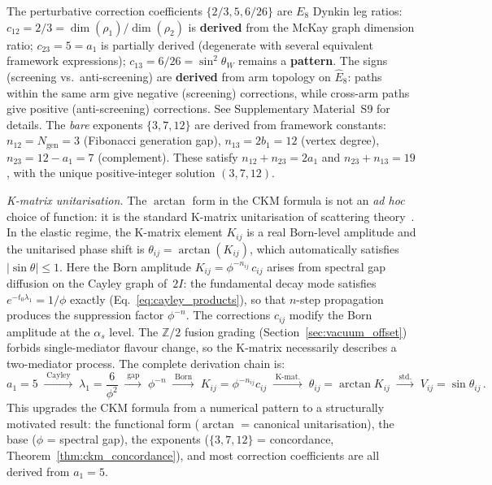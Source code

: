 \documentclass[12pt,a4paper]{article}
\theoremstyle{definition}
\begin{document}
The perturbative correction coefficients $\{2/3, 5, 6/26\}$ are $E_8$ Dynkin leg ratios: $c_{12} = 2/3 = \dim(\rho_1)/\dim(\rho_2)$ is \textbf{derived} from the McKay graph dimension ratio; $c_{23} = 5 = a_1$ is partially derived (degenerate with several equivalent framework expressions); $c_{13} = 6/26 = \sin^2\theta_W$ remains a \textbf{pattern}.  The signs (screening vs.\ anti-screening) are \textbf{derived} from arm topology on $\hat{E}_8$: paths within the same arm give negative (screening) corrections, while cross-arm paths give positive (anti-screening) corrections.  See Supplementary Material~S9 for details.  The \emph{bare} exponents $\{3, 7, 12\}$ are derived from framework constants: $n_{12} = N_{\text{gen}} = 3$ (Fibonacci generation gap), $n_{13} = 2b_1 = 12$ (vertex degree), $n_{23} = 12 - a_1 = 7$ (complement).  These satisfy $n_{12} + n_{23} = 2a_1$ and $n_{23} + n_{13} = 19$, with the unique positive-integer solution $(3, 7, 12)$.

\noindent\textit{K-matrix unitarisation.}  The $\arctan$ form in the CKM formula is not an \emph{ad hoc} choice of function: it is the standard K-matrix unitarisation of scattering theory~\cite{chew1966,dalitz1966}.  In the elastic regime, the K-matrix element $K_{ij}$ is a real Born-level amplitude and the unitarised phase shift is $\theta_{ij} = \arctan(K_{ij})$, which automatically satisfies $|\sin\theta| \leq 1$.  Here the Born amplitude $K_{ij} = \phi^{-n_{ij}}\,c_{ij}$ arises from spectral gap diffusion on the Cayley graph of~$2I$: the fundamental decay mode satisfies $e^{-t_0 \lambda_1} = 1/\phi$ exactly (Eq.~\ref{eq:cayley_products}), so that $n$-step propagation produces the suppression factor $\phi^{-n}$.  The corrections $c_{ij}$ modify the Born amplitude at the $\alpha_s$ level.  The $\mathbb{Z}/2$ fusion grading (Section~\ref{sec:vacuum_offset}) forbids single-mediator flavour change, so the K-matrix necessarily describes a two-mediator process.  The complete derivation chain is:
\begin{equation}
a_1\!=\!5 \;\xrightarrow{\;\text{Cayley}\;}\; \lambda_1\!=\!\frac{6}{\phi^2}
\;\xrightarrow{\;\text{gap}\;}\; \phi^{-n}
\;\xrightarrow{\;\text{Born}\;}\; K_{ij}\!=\!\phi^{-n_{ij}} c_{ij}
\;\xrightarrow{\;\text{K-mat.}\;}\; \theta_{ij}\!=\!\arctan K_{ij}
\;\xrightarrow{\;\text{std.}\;}\; V_{ij}\!=\!\sin\theta_{ij}\,.
\label{eq:kmatrix_chain}
\end{equation}
This upgrades the CKM formula from a numerical pattern to a structurally motivated result: the functional form ($\arctan$ = canonical unitarisation), the base ($\phi$ = spectral gap), the exponents ($\{3,7,12\}$ = concordance, Theorem~\ref{thm:ckm_concordance}), and most correction coefficients are all derived from $a_1 = 5$.
\end{document}
